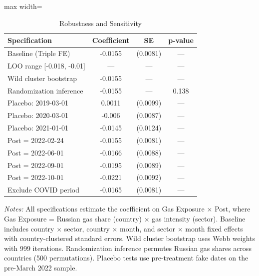 \begin{table}[htbp]
\centering
\caption{Robustness and Sensitivity}
\label{tab:robustness}
\begin{adjustbox}{max width=\textwidth}
\begin{tabular}{lccc}
\hline\hline
Specification & Coefficient & SE & p-value \\
\hline
Baseline (Triple FE) & -0.0155 & (0.0081) & --- \\
LOO range [-0.018, -0.01] & --- & --- & --- \\
Wild cluster bootstrap & -0.0155 & --- & --- \\
Randomization inference & -0.0155 & --- & 0.138 \\
Placebo: 2019-03-01 & 0.0011 & (0.0099) & --- \\
Placebo: 2020-03-01 & -0.006 & (0.0087) & --- \\
Placebo: 2021-01-01 & -0.0145 & (0.0124) & --- \\
Post = 2022-02-24 & -0.0155 & (0.0081) & --- \\
Post = 2022-06-01 & -0.0166 & (0.0088) & --- \\
Post = 2022-09-01 & -0.0195 & (0.0089) & --- \\
Post = 2022-10-01 & -0.0221 & (0.0092) & --- \\
Exclude COVID period & -0.0165 & (0.0081) & --- \\
\hline\hline
\end{tabular}
\end{adjustbox}
\begin{minipage}{0.95\textwidth}
\footnotesize
\textit{Notes:} All specifications estimate the coefficient on Gas Exposure $\times$ Post, where Gas Exposure = Russian gas share (country) $\times$ gas intensity (sector). Baseline includes country $\times$ sector, country $\times$ month, and sector $\times$ month fixed effects with country-clustered standard errors. Wild cluster bootstrap uses Webb weights with 999 iterations. Randomization inference permutes Russian gas shares across countries (500 permutations). Placebo tests use pre-treatment fake dates on the pre-March 2022 sample.
\end{minipage}
\end{table}

